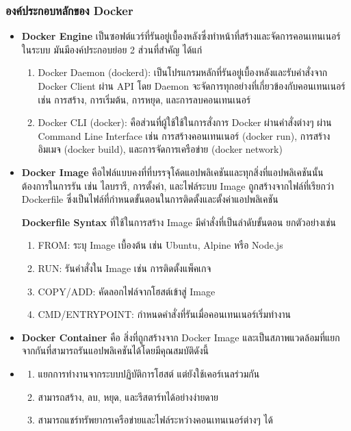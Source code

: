 \subsubsection{องค์ประกอบหลักของ Docker}
\begin{itemize}
  \item \textbf{Docker Engine} เป็นซอฟต์แวร์ที่รันอยู่เบื้องหลังซึ่งทำหน้าที่สร้างและจัดการคอนเทนเนอร์ในระบบ มันมีองค์ประกอบย่อย 2 ส่วนที่สำคัญ ได้แก่
  \begin{enumerate}
    \item Docker Daemon (dockerd): เป็นโปรแกรมหลักที่รันอยู่เบื้องหลังและรับคำสั่งจาก Docker Client ผ่าน API โดย Daemon จะจัดการทุกอย่างที่เกี่ยวข้องกับคอนเทนเนอร์ เช่น การสร้าง, การเริ่มต้น, การหยุด, และการลบคอนเทนเนอร์
    \item Docker CLI (docker): คือส่วนที่ผู้ใช้ใช้ในการสั่งการ Docker ผ่านคำสั่งต่างๆ ผ่าน Command Line Interface เช่น การสร้างคอนเทนเนอร์ (docker run), การสร้างอิมเมจ (docker build), และการจัดการเครือข่าย (docker network)
  \end{enumerate}
  \item \textbf{Docker Image} คือไฟล์แบบคงที่ที่บรรจุโค้ดแอปพลิเคชันและทุกสิ่งที่แอปพลิเคชันนั้นต้องการในการรัน เช่น ไลบรารี, การตั้งค่า, และไฟล์ระบบ Image ถูกสร้างจากไฟล์ที่เรียกว่า Dockerfile ซึ่งเป็นไฟล์ที่กำหนดขั้นตอนในการติดตั้งและตั้งค่าแอปพลิเคชัน
  
  \hspace{1cm}\textbf{Dockerfile Syntax} ที่ใช้ในการสร้าง Image มีคำสั่งที่เป็นลำดับขั้นตอน ยกตัวอย่างเช่น
  \hspace{1cm}\begin{enumerate}
    \item FROM: ระบุ Image เบื้องต้น เช่น Ubuntu, Alpine หรือ Node.js
    \item RUN: รันคำสั่งใน Image เช่น การติดตั้งแพ็คเกจ
    \item COPY/ADD: คัดลอกไฟล์จากโฮสต์เข้าสู่ Image
    \item CMD/ENTRYPOINT: กำหนดคำสั่งที่รันเมื่อคอนเทนเนอร์เริ่มทำงาน
  \end{enumerate}
  \item \textbf{Docker Container} คือ สิ่งที่ถูกสร้างจาก Docker Image และเป็นสภาพแวดล้อมที่แยกจากกันที่สามารถรันแอปพลิเคชันได้โดยมีคุณสมบัติดังนี้
  \item \begin{enumerate}
    \item แยกการทำงานจากระบบปฏิบัติการโฮสต์ แต่ยังใช้เคอร์เนลร่วมกัน
    \item สามารถสร้าง, ลบ, หยุด, และรีสตาร์ทได้อย่างง่ายดาย
    \item สามารถแชร์ทรัพยากรเครือข่ายและไฟล์ระหว่างคอนเทนเนอร์ต่างๆ ได้
  \end{enumerate}
\end{itemize}

